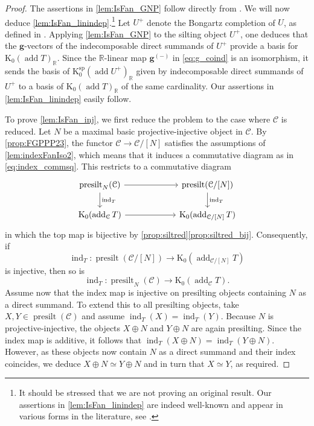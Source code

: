 \documentclass[10pt,twoside, a4paper,reqno]{amsart}
\DeclareMathOperator{\presilt}{presilt}
\DeclareMathOperator{\add}{add}
\DeclareMathOperator{\ind}{ind}
\newcommand{\R}{\mathbb{R}}
\newcommand{\calC}{\mathcal{C}}
\newcommand{\K}{\mathrm{K}}
\newcommand{\Ksp}{\mathrm{K}^{\mathrm{sp}}}
\newcommand{\bfg}{\mathbf{g}}
\theoremstyle{definition}
\begin{document}
\begin{proof}
    The assertions in \eqref{lem:IsFan_GNP} follow directly from \cite[Prop. 4.10]{GNP23}. We will now deduce \eqref{lem:IsFan_linindep}.\footnote{It should be stressed that we are not proving an original result. Our assertions in \eqref{lem:IsFan_linindep} are indeed well-known and appear in various forms in the literature{, see} \cite[{Thm.} 1.2]{OS23} \cite[{Thm.} 4.1]{AT23} \cite[{Thm.} 2.27]{AI12}.} Let $U^+$ denote the Bongartz completion of $U$, as defined in . Applying \eqref{lem:IsFan_GNP} to the silting object $U^+$, one deduces that the $\bfg$-vectors of the indecomposable direct summands of $U^+$ provide a basis for $\K_0(\add{T})_{\R}$. Since the $\R$-linear map $\bfg^{(-)}$ in \eqref{eq:g_coind} is an isomorphism, it sends the basis of $\Ksp_0(\add U^+)_{\R}$ given by {indecomposable direct summands of} $U^+$ to a basis of $\K_0(\add{T})_{\R}$ of the same cardinality. Our assertions in \eqref{lem:IsFan_linindep} easily follow.
    
     	To prove \eqref{lem:IsFan_inj}, we first reduce the problem to the case where $\calC$ is reduced. Let $N$ be a maximal basic projective-injective object in $\calC$. By \cref{prop:FGPPP23}, the functor $\calC \to \calC/[N]$ satisfies the assumptions of \cref{lem:indexFanIso2}, which means that it induces a commutative diagram as in \eqref{eq:index_commsq}. This restricts to a commutative diagram
	\begin{equation*}
    \begin{tikzcd}[column sep=6em]
        \presilt_N(\calC) \arrow[d," \ind_T"] \arrow[r] & {\presilt( \calC/[N])} \arrow[d,"\ind_{T} "] \\
        \K_0(\add_{\calC}{T})  \arrow[r] & \K_0(\add_{\calC/[N]} T)
    \end{tikzcd}
    \end{equation*}
    in which the top map is bijective by \cref{prop:siltred}\eqref{prop:siltred_bij}. Consequently, if 
    \[ \ind_T: \presilt(\calC/[N]) \to \K_0(\add_{\calC/[N]} T) \]
    is injective, then so is
    \[ \ind_T: \presilt_N(\calC) \to \K_0(\add_{\calC}{T}). \]
    Assume now that the index map is injective on presilting objects containing $N$ as a direct summand. To extend this to all presilting objects, take $X, Y \in \presilt(\calC)$ and assume $\ind_T(X) = \ind_T(Y)$. Because $N$ is projective-injective, the objects $X \oplus N$ and $Y \oplus N$ are again presilting. Since the index map is additive, it follows that $\ind_T(X \oplus N) = \ind_T(Y \oplus N)$. However, as these objects now contain $N$ as a direct summand and their index coincides, we deduce $X \oplus N \simeq Y \oplus N$ and in turn that $X \simeq Y$, as required.
    

\end{proof}
\end{document}
